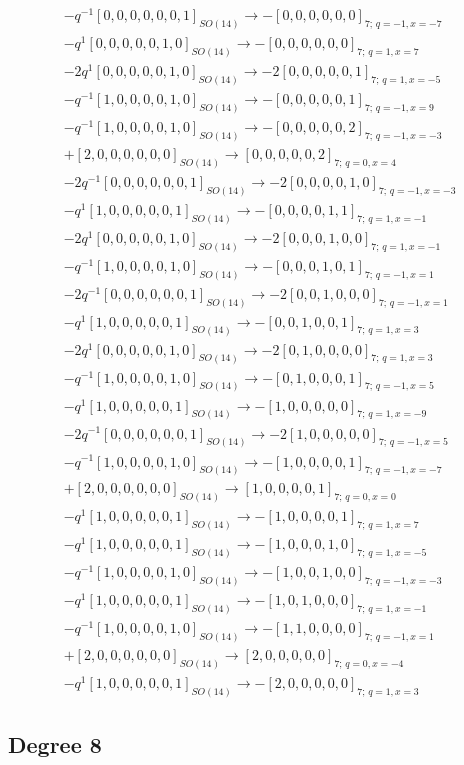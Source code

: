 \documentclass{article}
\begin{document}
\[\begin{gathered} -q^{-1}[0,0,0,0,0,0,1]_{SO(14)}\longrightarrow -[0,0,0,0,0,0]_{7;\,q=-1,x=-7}\\-q^{1}[0,0,0,0,0,1,0]_{SO(14)}\longrightarrow -[0,0,0,0,0,0]_{7;\,q=1,x=7}\\-2q^{1}[0,0,0,0,0,1,0]_{SO(14)}\longrightarrow -2[0,0,0,0,0,1]_{7;\,q=1,x=-5}\\-q^{-1}[1,0,0,0,0,1,0]_{SO(14)}\longrightarrow -[0,0,0,0,0,1]_{7;\,q=-1,x=9}\\-q^{-1}[1,0,0,0,0,1,0]_{SO(14)}\longrightarrow -[0,0,0,0,0,2]_{7;\,q=-1,x=-3}\\+[2,0,0,0,0,0,0]_{SO(14)}\longrightarrow [0,0,0,0,0,2]_{7;\,q=0,x=4}\\-2q^{-1}[0,0,0,0,0,0,1]_{SO(14)}\longrightarrow -2[0,0,0,0,1,0]_{7;\,q=-1,x=-3}\\-q^{1}[1,0,0,0,0,0,1]_{SO(14)}\longrightarrow -[0,0,0,0,1,1]_{7;\,q=1,x=-1}\\-2q^{1}[0,0,0,0,0,1,0]_{SO(14)}\longrightarrow -2[0,0,0,1,0,0]_{7;\,q=1,x=-1}\\-q^{-1}[1,0,0,0,0,1,0]_{SO(14)}\longrightarrow -[0,0,0,1,0,1]_{7;\,q=-1,x=1}\\-2q^{-1}[0,0,0,0,0,0,1]_{SO(14)}\longrightarrow -2[0,0,1,0,0,0]_{7;\,q=-1,x=1}\\-q^{1}[1,0,0,0,0,0,1]_{SO(14)}\longrightarrow -[0,0,1,0,0,1]_{7;\,q=1,x=3}\\-2q^{1}[0,0,0,0,0,1,0]_{SO(14)}\longrightarrow -2[0,1,0,0,0,0]_{7;\,q=1,x=3}\\-q^{-1}[1,0,0,0,0,1,0]_{SO(14)}\longrightarrow -[0,1,0,0,0,1]_{7;\,q=-1,x=5}\\-q^{1}[1,0,0,0,0,0,1]_{SO(14)}\longrightarrow -[1,0,0,0,0,0]_{7;\,q=1,x=-9}\\-2q^{-1}[0,0,0,0,0,0,1]_{SO(14)}\longrightarrow -2[1,0,0,0,0,0]_{7;\,q=-1,x=5}\\-q^{-1}[1,0,0,0,0,1,0]_{SO(14)}\longrightarrow -[1,0,0,0,0,1]_{7;\,q=-1,x=-7}\\+[2,0,0,0,0,0,0]_{SO(14)}\longrightarrow [1,0,0,0,0,1]_{7;\,q=0,x=0}\\-q^{1}[1,0,0,0,0,0,1]_{SO(14)}\longrightarrow -[1,0,0,0,0,1]_{7;\,q=1,x=7}\\-q^{1}[1,0,0,0,0,0,1]_{SO(14)}\longrightarrow -[1,0,0,0,1,0]_{7;\,q=1,x=-5}\\-q^{-1}[1,0,0,0,0,1,0]_{SO(14)}\longrightarrow -[1,0,0,1,0,0]_{7;\,q=-1,x=-3}\\-q^{1}[1,0,0,0,0,0,1]_{SO(14)}\longrightarrow -[1,0,1,0,0,0]_{7;\,q=1,x=-1}\\-q^{-1}[1,0,0,0,0,1,0]_{SO(14)}\longrightarrow -[1,1,0,0,0,0]_{7;\,q=-1,x=1}\\+[2,0,0,0,0,0,0]_{SO(14)}\longrightarrow [2,0,0,0,0,0]_{7;\,q=0,x=-4}\\-q^{1}[1,0,0,0,0,0,1]_{SO(14)}\longrightarrow -[2,0,0,0,0,0]_{7;\,q=1,x=3}\end{gathered}\]\subsection*{Degree 8}
\end{document}
